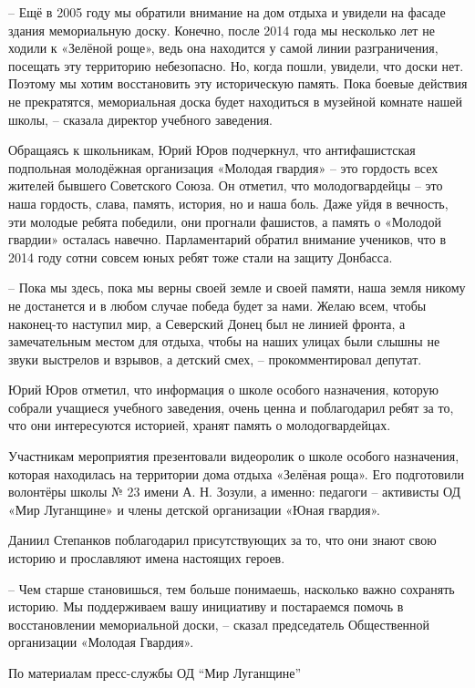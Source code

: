 
– Ещё в 2005 году мы обратили внимание на дом отдыха и увидели на фасаде здания
мемориальную доску. Конечно, после 2014 года мы несколько лет не ходили к
«Зелёной роще», ведь она находится у самой линии разграничения, посещать эту
территорию небезопасно. Но, когда пошли, увидели, что доски нет. Поэтому мы
хотим восстановить эту историческую память. Пока боевые действия не
прекратятся, мемориальная доска будет находиться в музейной комнате нашей
школы, – сказала директор учебного заведения.

Обращаясь к школьникам, Юрий Юров подчеркнул, что антифашистская подпольная
молодёжная организация «Молодая гвардия» – это гордость всех жителей бывшего
Советского Союза. Он отметил, что молодогвардейцы – это наша гордость, слава,
память, история, но и наша боль. Даже уйдя в вечность, эти молодые ребята
победили, они прогнали фашистов, а память о «Молодой гвардии» осталась навечно.
Парламентарий обратил внимание учеников, что в 2014 году сотни совсем юных
ребят тоже стали на защиту Донбасса.

– Пока мы здесь, пока мы верны своей земле и своей памяти, наша земля никому не
достанется и в любом случае победа будет за нами. Желаю всем, чтобы наконец-то
наступил мир, а Северский Донец был не линией фронта, а замечательным местом
для отдыха, чтобы на наших улицах были слышны не звуки выстрелов и взрывов, а
детский смех, – прокомментировал депутат.

Юрий Юров отметил, что информация о школе особого назначения, которую собрали
учащиеся учебного заведения, очень ценна и поблагодарил ребят за то, что они
интересуются историей, хранят память о молодогвардейцах.

Участникам мероприятия презентовали видеоролик о школе особого назначения,
которая находилась на территории дома отдыха «Зелёная роща». Его подготовили
волонтёры школы № 23 имени А. Н. Зозули, а именно: педагоги – активисты ОД «Мир
Луганщине» и члены детской организации «Юная гвардия».

Даниил Степанков поблагодарил присутствующих за то, что они знают свою историю
и прославляют имена настоящих героев.

– Чем старше становишься, тем больше понимаешь, насколько важно сохранять
историю. Мы поддерживаем вашу инициативу и постараемся помочь в восстановлении
мемориальной доски, – сказал председатель Общественной организации «Молодая
Гвардия».

По материалам пресс-службы ОД \enquote{Мир Луганщине}

